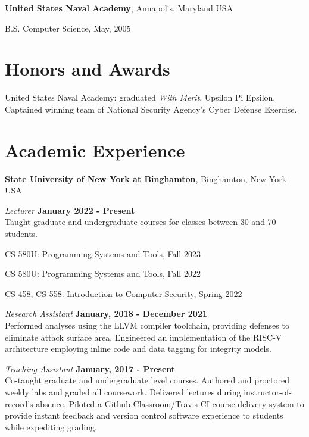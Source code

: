 \documentclass[margin,line]{res}
\begin{document}
\begin{resume}
{\bf United States Naval Academy}, Annapolis, Maryland USA\\
\vspace*{-.1in}
\begin{list2}
\item[] B.S. Computer Science,  May, 2005
\end{list2}

\section{\sc Honors and Awards}

United States Naval Academy: graduated \textit{With Merit}, Upsilon Pi Epsilon. Captained winning team of National Security Agency's Cyber Defense Exercise.


\section{\sc Academic Experience}

{\bf State University of New York at Binghamton}, Binghamton, New York USA

\vspace{-0.3cm}
{\em Lecturer} \hfill {\bf January 2022 \-- Present} \\
Taught graduate and undergraduate courses for classes between 30 and 70 students.

\begin{list2}
\item CS 580U: Programming Systems and Tools, Fall 2023
\item CS 580U: Programming Systems and Tools, Fall 2022
\item CS 458, CS 558: Introduction to Computer Security, Spring 2022
\end{list2}

\vspace{-0.1cm}
{\em Research Assistant} \hfill {\bf January, 2018 - December 2021}\\
Performed analyses using the LLVM compiler toolchain, providing defenses to eliminate attack surface area. Engineered an implementation of the RISC-V architecture employing inline code and data tagging for integrity models.

\vspace{-.1cm}
{\em Teaching Assistant} \hfill {\bf January, 2017 \-- Present}\\
Co-taught graduate and undergraduate level courses. Authored and proctored weekly labs and graded all coursework. Delivered lectures during instructor-of-record's absence. Piloted a Github Classroom/Travis-CI course delivery system to provide instant feedback and version control software experience to students while expediting grading.


\end{resume}
\end{document}
